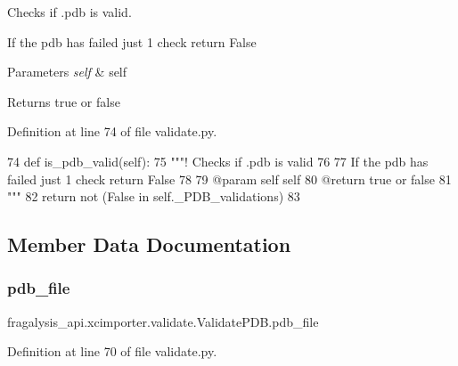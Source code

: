 Checks if .pdb is valid. 

If the pdb has failed just 1 check return False


\begin{DoxyParams}{Parameters}
{\em self} & self \\
\hline
\end{DoxyParams}
\begin{DoxyReturn}{Returns}
true or false 
\end{DoxyReturn}


Definition at line 74 of file validate.\+py.


\begin{DoxyCode}
74     \textcolor{keyword}{def }is\_pdb\_valid(self):
75         \textcolor{stringliteral}{"""! Checks if .pdb is valid}
76 \textcolor{stringliteral}{        }
77 \textcolor{stringliteral}{        If the pdb has failed just 1 check return False}
78 \textcolor{stringliteral}{        }
79 \textcolor{stringliteral}{        @param self self}
80 \textcolor{stringliteral}{        @return true or false}
81 \textcolor{stringliteral}{        """}
82         \textcolor{keywordflow}{return} \textcolor{keywordflow}{not} (\textcolor{keyword}{False} \textcolor{keywordflow}{in} self.\_PDB\_validations)
83 
\end{DoxyCode}


\subsection{Member Data Documentation}
\mbox{\label{classfragalysis__api_1_1xcimporter_1_1validate_1_1_validate_p_d_b_a9c42b0ed963d65498056ac184793b0f0}} 
\subsubsection{\texorpdfstring{pdb\+\_\+file}{pdb\_file}}
{\footnotesize\ttfamily fragalysis\+\_\+api.\+xcimporter.\+validate.\+Validate\+P\+D\+B.\+pdb\+\_\+file}



Definition at line 70 of file validate.\+py.

